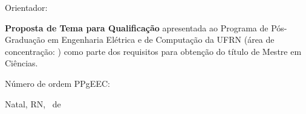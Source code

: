 \begin{titlepage}
\begin{center}
\vfill

\LARGE

\textbf{\titulo}

\vfill

\Large

\textbf{\nome}

\vfill

\normalsize

Orientador: \orientadorTitulo\ \orientadorNome 
{}


\vfill

\hfill
\ifnum{}
  \newcommand{\tmpTitulo}{Mestre em Ciências}
\else
  \newcommand{\tmpTitulo}{Doutor em Ciências}
\fi

\ifnum{}
  \newcommand{\tmpTipoTrabalho}{Proposta de Tema para Qualificação}
\else
  \ifnum{}
    \newcommand{\tmpTipoTrabalho}{Dissertação de Mestrado}
  \else
    \newcommand{\tmpTipoTrabalho}{Tese de Doutorado}
  \fi
\fi

\parbox{0.5\linewidth}{\textbf{\tmpTipoTrabalho} apresentada ao Programa de Pós-Graduação em Engenharia Elétrica e de Computação da UFRN
(área de concentração: \areaConcentracao)
como parte dos requisitos para obtenção do título de \tmpTitulo .
}

\vfill

\large

Número de ordem PPgEEC: \numeroOrdem

Natal, RN, \ de 

\end{center}

\end{titlepage}
